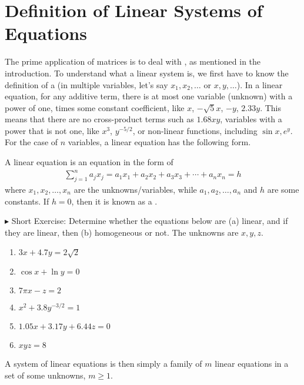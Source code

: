 \section{Definition of Linear Systems of Equations}
\label{section:deflinsys}
The prime application of matrices is to deal with , as mentioned in the introduction. To understand what a linear system is, we first have to know the definition of a  (in multiple variables, let's say $x_1, x_2, \ldots$ or $x, y, \ldots$). In a linear equation, for any additive term, there is at most one variable (unknown) with a power of one, times some constant coefficient, like $x$, $-\sqrt{5}x$, $-y$, $2.33y$. This means that there are no cross-product terms such as $1.68xy$, variables with a power that is not one, like $x^3$, $y^{-5/2}$, or non-linear functions, including $\sin{x}, e^{y}$. For the case of $n$ variables, a linear equation has the following form.
\begin{defn}
A linear equation is an equation in the form of
\begin{align}
\sum_{j=1}^n a_jx_j = a_1x_1 + a_2x_2 + a_3x_3 + \cdots + a_nx_n = h
\end{align}
where $x_1, x_2, \ldots, x_n$ are the unknowns/variables, while $a_1, a_2, \ldots, a_n$ and $h$ are some constants. If $h = 0$, then it is known as a .
\end{defn}
$\blacktriangleright$ Short Exercise: Determine whether the equations below are (a) linear, and if they are linear, then (b) homogeneous or not. The unknowns are $x, y, z$.\footnotemark
\begin{enumerate}
    \item $3x + 4.7y = 2\sqrt{2}$ 
    \item $\cos x + \ln y = 0$
    \item $7\pi x - z = 2$ 
    \item $x^2 + 3.8y^{-3/2} = 1$
    \item $1.05x + 3.17y + 6.44z = 0$
    \item $xyz = 8$ 
\end{enumerate}
A system of linear equations is then simply a family of $m$ linear equations in a set of some unknowns, $m \geq 1$.
